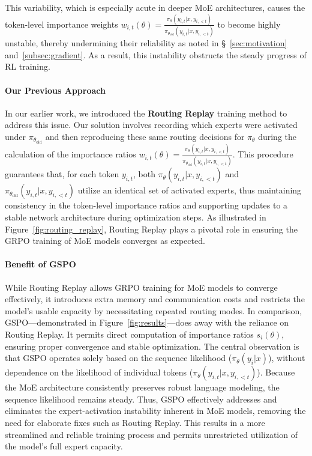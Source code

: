 This variability, which is especially acute in deeper MoE architectures, causes the token-level importance weights $w_{i,t}(\theta) = \frac{ \pi_{\theta} (y_{i,t} | x, y_{i,<t}) }{ \pi_{\theta_\text{old}} (y_{i,t} | x,y_{i,<t})}$ to become highly unstable, thereby undermining their reliability as noted in \S~\ref{sec:motivation} and~\ref{subsec:gradient}. As a result, this instability obstructs the steady progress of RL training.

\paragraph{Our Previous Approach} In our earlier work, we introduced the \textbf{Routing Replay} training method to address this issue. Our solution involves recording which experts were activated under $\pi_{\theta_\text{old}}$ and then reproducing these same routing decisions for $\pi_{\theta}$ during the calculation of the importance ratios $w_{i,t}(\theta) = \frac{ \pi_{\theta} (y_{i,t} | x, y_{i,<t}) }{ \pi_{\theta_\text{old}} (y_{i,t} | x,y_{i,<t})}$. This procedure guarantees that, for each token $y_{i,t}$, both $\pi_{\theta} (y_{i,t} | x, y_{i,<t})$ and $\pi_{\theta_\text{old}} (y_{i,t} | x,y_{i,<t})$ utilize an identical set of activated experts, thus maintaining consistency in the token-level importance ratios and supporting updates to a stable network architecture during optimization steps. As illustrated in Figure~\ref{fig:routing_replay}, Routing Replay plays a pivotal role in ensuring the GRPO training of MoE models converges as expected.

\paragraph{Benefit of GSPO} While Routing Replay allows GRPO training for MoE models to converge effectively, it introduces extra memory and communication costs and restricts the model’s usable capacity by necessitating repeated routing modes. In comparison, GSPO—demonstrated in Figure~\ref{fig:results}—does away with the reliance on Routing Replay. It permits direct computation of importance ratios $s_i(\theta)$, ensuring proper convergence and stable optimization. The central observation is that GSPO operates solely based on the sequence likelihood ($\pi_{\theta} (y_i | x)$), without dependence on the likelihood of individual tokens ($\pi_{\theta} (y_{i,t} | x, y_{i,<t})$). Because the MoE architecture consistently preserves robust language modeling, the sequence likelihood remains steady. Thus, GSPO effectively addresses and eliminates the expert-activation instability inherent in MoE models, removing the need for elaborate fixes such as Routing Replay. This results in a more streamlined and reliable training process and permits unrestricted utilization of the model’s full expert capacity.

